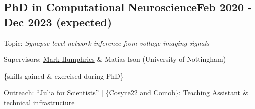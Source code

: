 \vspace*{4pt}
\subsection {{PhD in Computational Neuroscience}\hfill Feb 2020 - Dec 2023 (expected)}
\vspace*{4pt}

Topic: {\large\emph{Synapse-level network inference from voltage imaging signals}}
\vspace*{4pt}

Supervisors: \href{https://www.humphries-lab.org/}{Mark Humphries} \& Matias Ison (University of Nottingham)
\vspace*{4pt}

\{skills gained \& exercised during PhD\}
\vspace*{4pt}

Outreach:
\href{https://tomasfiers.net/posts/julia-for-scientists/}{``Julia for Scientists''} | \{Cosyne22 and Comob\}: Teaching Assistant \& technical infrastructure
